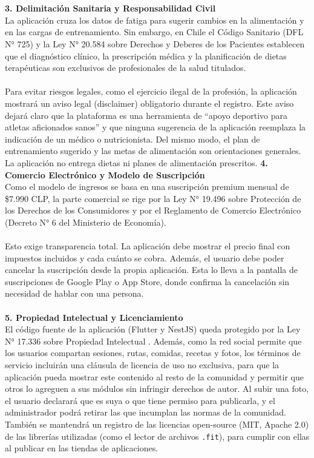 \\\\
\textbf{3. Delimitación Sanitaria y Responsabilidad Civil}\\
La aplicación cruza los datos de fatiga para sugerir cambios en la alimentación y en las cargas de entrenamiento. Sin embargo, en Chile el Código Sanitario (DFL N° 725) \citep{dfl725} y la Ley N° 20.584 sobre Derechos y Deberes de los Pacientes \citep{ley20584} establecen que el diagnóstico clínico, la prescripción médica y la planificación de dietas terapéuticas son exclusivos de profesionales de la salud titulados.
\\\\
Para evitar riesgos legales, como el ejercicio ilegal de la profesión, la aplicación mostrará un aviso legal (disclaimer) obligatorio durante el registro. Este aviso dejará claro que la plataforma es una herramienta de ``apoyo deportivo para atletas aficionados sanos'' y que ninguna sugerencia de la aplicación reemplaza la indicación de un médico o nutricionista. Del mismo modo, el plan de entrenamiento sugerido y las metas de alimentación son orientaciones generales. La aplicación no entrega dietas ni planes de alimentación prescritos.
\textbf{4. Comercio Electrónico y Modelo de Suscripción}\\
Como el modelo de ingresos se basa en una suscripción premium mensual de \$7.990 CLP, la parte comercial se rige por la Ley N° 19.496 sobre Protección de los Derechos de los Consumidores \citep{ley19496} y por el Reglamento de Comercio Electrónico (Decreto N° 6 del Ministerio de Economía).
\\\\
Esto exige transparencia total. La aplicación debe mostrar el precio final con impuestos incluidos y cada cuánto se cobra. Además, el usuario debe poder cancelar la suscripción desde la propia aplicación. Esta lo lleva a la pantalla de suscripciones de Google Play o App Store, donde confirma la cancelación sin necesidad de hablar con una persona.
\\\\
\textbf{5. Propiedad Intelectual y Licenciamiento}\\
El código fuente de la aplicación (Flutter y NestJS) queda protegido por la Ley N° 17.336 sobre Propiedad Intelectual \citep{ley17336}. Además, como la red social permite que los usuarios compartan sesiones, rutas, comidas, recetas y fotos, los términos de servicio incluirán una cláusula de licencia de uso no exclusiva, para que la aplicación pueda mostrar este contenido al resto de la comunidad y permitir que otros lo agreguen a sus módulos sin infringir derechos de autor. Al subir una foto, el usuario declarará que es suya o que tiene permiso para publicarla, y el administrador podrá retirar las que incumplan las normas de la comunidad. También se mantendrá un registro de las licencias open-source (MIT, Apache 2.0) de las librerías utilizadas (como el lector de archivos \texttt{.fit}), para cumplir con ellas al publicar en las tiendas de aplicaciones.
